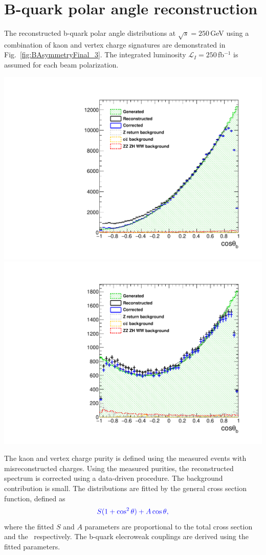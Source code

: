 \section*{B-quark polar angle reconstruction}

The reconstructed b-quark polar angle distributions at $\sqrt{s} = 250$\,GeV using a combination of kaon and vertex charge signatures are demonstrated in Fig.~\ref{fig:BAsymmetryFinal_3}. The integrated luminosity $\mathcal{L}_I = 250$\,fb$^{-1}$ is assumed for each beam polarization.
\begin{center}\vspace{1cm}

	\includegraphics[width=0.4\linewidth]{../ILD/plots/basymmetry-final-left.pdf}
	\includegraphics[width=0.4\linewidth]{../ILD/plots/basymmetry-final-right.pdf}
		\label{fig:BAsymmetryFinal_3}
\end{center}\vspace{1cm}
The kaon and vertex charge purity is defined using the measured events with misreconstructed charges. Using the measured purities, the reconstructed spectrum is corrected using a data-driven procedure.
The background contribution is small. 
The distributions are fitted by the general cross section function, defined as 
\begin{equation}
{\color{Blue}	S (1+\cos^2\theta) + A \cos\theta,}
\end{equation}
where the fitted $S$ and $A$ parameters are proportional to the total cross section and the \afb\, respectively. 
The b-quark elecroweak couplings are derived using the fitted parameters. 
